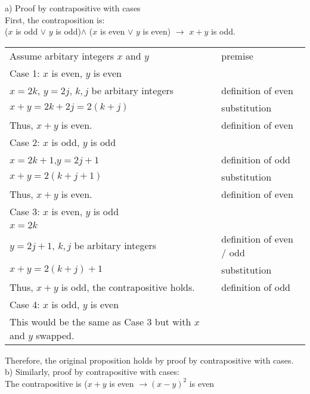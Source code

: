 \documentclass[12pt]{exam}
\begin{document}
\begin{solution}
	a) Proof by contrapositive with cases\\
	First, the contraposition is:\\
	($x$ is odd $\lor$ $y$ is odd)$\land$ ($x$ is even $\lor$ $y$ is even) $\rightarrow$ $x+y$ is odd.\\
	\begin{tabular}{ll}
		Assume arbitary integers $x$ and $y$          & premise                  \\
		Case 1: $x$ is even, $y$ is even                                         \\
		$x=2k$, $y=2j$, $k,j$ be arbitary integers    & definition of even       \\
		$x+y=2k+2j=2(k+j)$                            & substitution             \\
		Thus, $x+y$ is even.                          & definition of even       \\
		Case 2: $x$ is odd, $y$ is odd                                           \\
		$x=2k+1$,$y=2j+1$                             & definition of odd        \\
		$x+y=2(k+j+1)$                                & substitution             \\
		Thus, $x+y$ is even.                          & definition of even       \\
		Case 3: $x$ is even, $y$ is odd                                          \\
		$x=2k$                                                                   \\
		$y=2j+1$, $k,j$ be arbitary integers          & definition of even / odd \\
		$x+y=2(k+j)+1$                                & substitution             \\
		Thus, $x+y$ is odd, the contrapositive holds. & definition of odd        \\
		Case 4: $x$ is odd, $y$ is even                                          \\
		This would be the same as Case 3 but with $x$ and $y$ swapped.           \\
	\end{tabular}
	Therefore, the original proposition holds by proof by contrapositive with cases.\\
	b) Similarly, proof by contrapositive with cases:\\
	The contrapositive is ($x+y$ is even $\rightarrow (x-y)^2$ is even\\


\end{solution}
\end{document}
